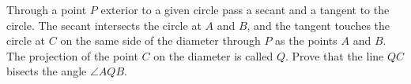 Through a point $P$ exterior to a given circle pass a secant and a tangent to the circle. The secant intersects the circle at $A$ and $B$,  and the tangent touches the circle at $C$ on the same side of the diameter through $P$ as the points $A$ and $B$. The projection of the point $C$ on the diameter is called $Q$. Prove that the line $QC$ bisects the angle $\angle AQB$.